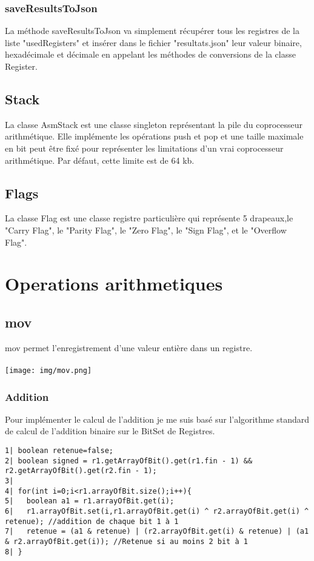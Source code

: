 \documentclass{article}
\begin{document}
\subsubsection{saveResultsToJson}

La méthode saveResultsToJson va simplement récupérer tous les registres de la liste "usedRegisters" et insérer dans le fichier "resultats.json"
leur valeur binaire, hexadécimale et décimale en appelant les méthodes de conversions de la classe Register.


\subsection{Stack}

La classe AsmStack est une classe singleton représentant la pile du coprocesseur arithmétique. Elle implémente les opérations push et pop et
une taille maximale en bit peut être fixé pour représenter les limitations d'un vrai coprocesseur arithmétique. Par défaut, cette limite est de 64 kb.

\subsection{Flags}

La classe Flag est une classe registre particulière qui représente 5 drapeaux,le "Carry Flag", le "Parity Flag", le "Zero Flag", le "Sign Flag", et le "Overflow Flag".

\section{Operations arithmetiques}
\subsection{mov}
mov permet l'enregistrement d'une valeur entière dans un registre.
\\
\\
\texttt{[image: img/mov.png]}

\newpage
\subsubsection{Addition}
Pour implémenter le calcul de l'addition je me suis basé sur l'algorithme standard de calcul de l'addition binaire sur le BitSet de Registres.

\begin{verbatim}
1| boolean retenue=false;
2| boolean signed = r1.getArrayOfBit().get(r1.fin - 1) && r2.getArrayOfBit().get(r2.fin - 1);
3|
4| for(int i=0;i<r1.arrayOfBit.size();i++){
5|   boolean a1 = r1.arrayOfBit.get(i);
6|   r1.arrayOfBit.set(i,r1.arrayOfBit.get(i) ^ r2.arrayOfBit.get(i) ^ retenue); //addition de chaque bit 1 à 1
7|   retenue = (a1 & retenue) | (r2.arrayOfBit.get(i) & retenue) | (a1 & r2.arrayOfBit.get(i)); //Retenue si au moins 2 bit à 1
8| }
\end{verbatim}
\end{document}
